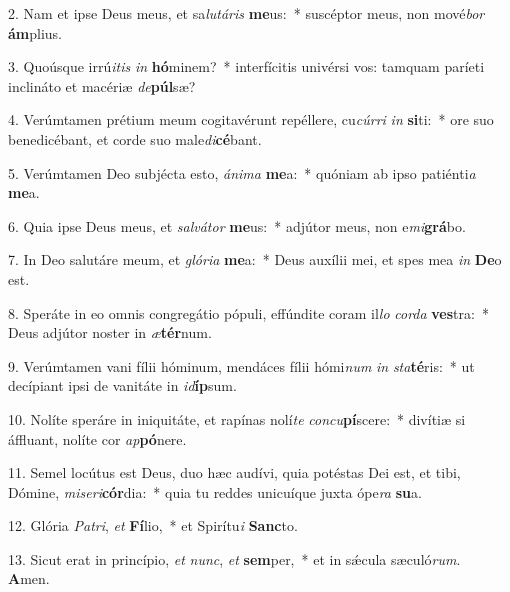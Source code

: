 2. Nam et ipse Deus meus, et sa\textit{lu}\textit{tá}\textit{ris} \textbf{me}us:~*  suscéptor meus, non mové\textit{bor} \textbf{ám}plius.\

3. Quoúsque irrú\textit{i}\textit{tis} \textit{in} \textbf{hó}minem?~*  interfícitis univérsi vos: tamquam paríeti inclináto et macériæ \textit{de}\textbf{púl}sæ?\

4. Verúmtamen prétium meum cogitavérunt repéllere, cu\textit{cúr}\textit{ri} \textit{in} \textbf{si}ti:~*  ore suo benedicébant, et corde suo male\textit{di}\textbf{cé}bant.\

5. Verúmtamen Deo subjécta esto, \textit{á}\textit{ni}\textit{ma} \textbf{me}a:~*  quóniam ab ipso patiénti\textit{a} \textbf{me}a.\

6. Quia ipse Deus meus, et \textit{sal}\textit{vá}\textit{tor} \textbf{me}us:~*  adjútor meus, non e\textit{mi}\textbf{grá}bo.\

7. In Deo salutáre meum, et \textit{gló}\textit{ri}\textit{a} \textbf{me}a:~*  Deus auxílii mei, et spes mea \textit{in} \textbf{De}o est.\

8. Speráte in eo omnis congregátio pópuli, effúndite coram il\textit{lo} \textit{cor}\textit{da} \textbf{ves}tra:~*  Deus adjútor noster in \textit{æ}\textbf{tér}num.\

9. Verúmtamen vani fílii hóminum, mendáces fílii hómi\textit{num} \textit{in} \textit{sta}\textbf{té}ris:~*  ut decípiant ipsi de vanitáte in \textit{id}\textbf{íp}sum.\

10. Nolíte speráre in iniquitáte, et rapínas nolí\textit{te} \textit{con}\textit{cu}\textbf{pí}scere:~*  divítiæ si áffluant, nolíte cor \textit{ap}\textbf{pó}nere.\

11. Semel locútus est Deus, duo hæc audívi, quia potéstas Dei est, et tibi, Dómine, \textit{mi}\textit{se}\textit{ri}\textbf{cór}dia:~*  quia tu reddes unicuíque juxta ópe\textit{ra} \textbf{su}a.\

12. Glória \textit{Pa}\textit{tri}, \textit{et} \textbf{Fí}lio,~*  et Spirítu\textit{i} \textbf{Sanc}to.\

13. Sicut erat in princípio, \textit{et} \textit{nunc}, \textit{et} \textbf{sem}per,~*  et in sǽcula sæculó\textit{rum}. \textbf{A}men.\

